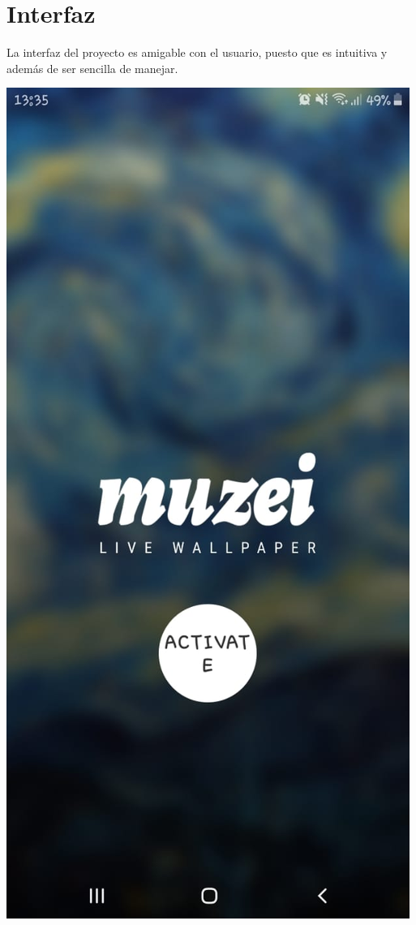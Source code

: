 \documentclass[12pt,a4paper]{article}
\begin{document}
{\section{Interfaz}
La interfaz del proyecto es amigable con el usuario, puesto que es intuitiva y además de ser sencilla de manejar.\\

\begin{Interfaz}
\centering
\includegraphics[scale=0.2]{Interfaz.jpeg}
\end{Interfaz}
\\
\\

}
\end{document}

